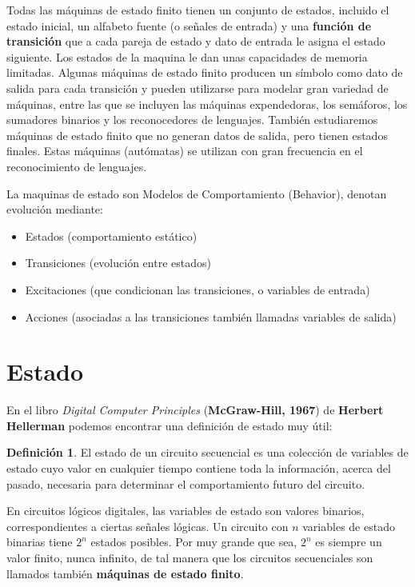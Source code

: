 \documentclass[12pt]{book}
\theoremstyle{definition}
\newtheorem{dfn}{Definición}[section]
\theoremstyle{remark}
\theoremstyle{plain}
\begin{document}
Todas las máquinas de estado finito tienen un conjunto de estados, incluido el estado inicial, 
un alfabeto fuente (o señales de entrada) y una \textbf{función de transición} que a
cada pareja de estado y dato de entrada le asigna el estado siguiente. Los estados
de la maquina le dan unas capacidades de memoria limitadas. Algunas
máquinas de estado finito producen un símbolo como dato de salida para cada
transición y pueden utilizarse para modelar gran variedad de máquinas, entre
las que se incluyen las máquinas expendedoras, los semáforos, los sumadores
binarios y los reconocedores de lenguajes. También estudiaremos máquinas de
estado finito que no generan datos de salida, pero tienen estados finales. Estas
máquinas (autómatas) se utilizan con gran frecuencia en el reconocimiento de lenguajes.



La maquinas de estado son Modelos de Comportamiento (Behavior), denotan evolución mediante:
\begin{itemize}
\item Estados (comportamiento estático)
\item Transiciones (evolución entre estados)
\item Excitaciones (que condicionan las transiciones, o variables de entrada)
\item Acciones (asociadas a las transiciones también llamadas variables de salida)
\end{itemize}

\section{Estado}

En el libro \textit{Digital Computer Principles} (\textbf{McGraw-Hill, 1967}) de \textbf{Herbert Hellerman} podemos encontrar una definición de estado muy útil:

\begin{dfn}
\label{def1}
El estado de un circuito secuencial es una colección de variables de estado cuyo valor en cualquier tiempo contiene toda la información, acerca del pasado, necesaria para determinar el comportamiento futuro del circuito.
\end{dfn}

En circuitos lógicos digitales, las variables de estado son valores binarios, correspondientes a ciertas señales lógicas. Un circuito con $n$ variables de estado binarias tiene $2^n$ estados posibles. Por muy grande que sea, $2^n$ es siempre un valor finito, nunca infinito, de tal manera que los circuitos secuenciales son llamados también \textbf{máquinas de estado finito}.
\end{document}

